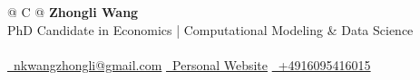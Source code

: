 \documentclass[a4paper,12pt]{article}
\begin{document}



\begin{tabularx}{\linewidth}{@{} C @{}}
\Huge{\textbf{Zhongli Wang}} \\[7.5pt]
PhD Candidate in Economics | Computational Modeling \& Data Science \\
\\
\href{mailto:nkwangzhongli@gmail.com}{\raisebox{-0.05\height}\faEnvelope \ nkwangzhongli@gmail.com}\; %
\href{https://sites.google.com/view/zhongli-wang/}{\raisebox{-0.05\height}\faGlobe \ Personal Website}\; %
\href{tel:+4916095416015}{\raisebox{-0.05\height}\faMobile \ +4916095416015} \\


\end{tabularx}

\fancyfoot[R]{\small\textcolor{lightgray}{Updated: \today}}

\end{document}
